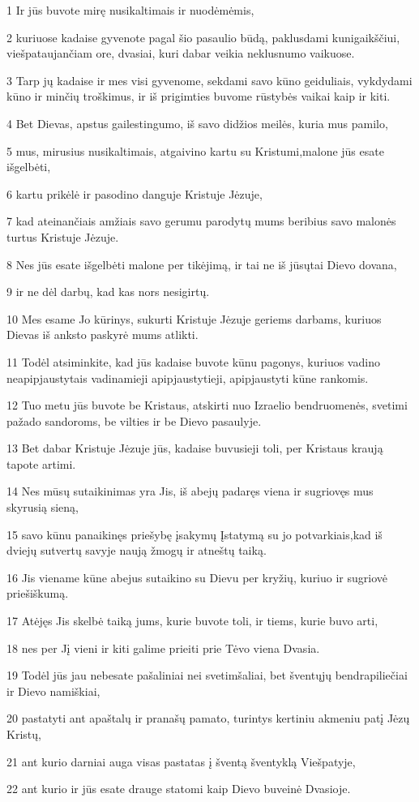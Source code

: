 \par 1 Ir jūs buvote mirę nusikaltimais ir nuodėmėmis, 
\par 2 kuriuose kadaise gyvenote pagal šio pasaulio būdą, paklusdami kunigaikščiui, viešpataujančiam ore, dvasiai, kuri dabar veikia neklusnumo vaikuose. 
\par 3 Tarp jų kadaise ir mes visi gyvenome, sekdami savo kūno geiduliais, vykdydami kūno ir minčių troškimus, ir iš prigimties buvome rūstybės vaikai kaip ir kiti. 
\par 4 Bet Dievas, apstus gailestingumo, iš savo didžios meilės, kuria mus pamilo, 
\par 5 mus, mirusius nusikaltimais, atgaivino kartu su Kristumi,­malone jūs esate išgelbėti,­ 
\par 6 kartu prikėlė ir pasodino danguje Kristuje Jėzuje, 
\par 7 kad ateinančiais amžiais savo gerumu parodytų mums beribius savo malonės turtus Kristuje Jėzuje. 
\par 8 Nes jūs esate išgelbėti malone per tikėjimą, ir tai ne iš jūsų­tai Dievo dovana, 
\par 9 ir ne dėl darbų, kad kas nors nesigirtų. 
\par 10 Mes esame Jo kūrinys, sukurti Kristuje Jėzuje geriems darbams, kuriuos Dievas iš anksto paskyrė mums atlikti. 
\par 11 Todėl atsiminkite, kad jūs kadaise buvote kūnu pagonys, kuriuos vadino neapipjaustytais vadinamieji apipjaustytieji, apipjaustyti kūne rankomis. 
\par 12 Tuo metu jūs buvote be Kristaus, atskirti nuo Izraelio bendruomenės, svetimi pažado sandoroms, be vilties ir be Dievo pasaulyje. 
\par 13 Bet dabar Kristuje Jėzuje jūs, kadaise buvusieji toli, per Kristaus kraują tapote artimi. 
\par 14 Nes mūsų sutaikinimas yra Jis, iš abejų padaręs viena ir sugriovęs mus skyrusią sieną, 
\par 15 savo kūnu panaikinęs priešybę­ įsakymų Įstatymą su jo potvarkiais,­kad iš dviejų sutvertų savyje naują žmogų ir atneštų taiką. 
\par 16 Jis viename kūne abejus sutaikino su Dievu per kryžių, kuriuo ir sugriovė priešiškumą. 
\par 17 Atėjęs Jis skelbė taiką jums, kurie buvote toli, ir tiems, kurie buvo arti, 
\par 18 nes per Jį vieni ir kiti galime prieiti prie Tėvo viena Dvasia. 
\par 19 Todėl jūs jau nebesate pašaliniai nei svetimšaliai, bet šventųjų bendrapiliečiai ir Dievo namiškiai, 
\par 20 pastatyti ant apaštalų ir pranašų pamato, turintys kertiniu akmeniu patį Jėzų Kristų, 
\par 21 ant kurio darniai auga visas pastatas į šventą šventyklą Viešpatyje, 
\par 22 ant kurio ir jūs esate drauge statomi kaip Dievo buveinė Dvasioje.


